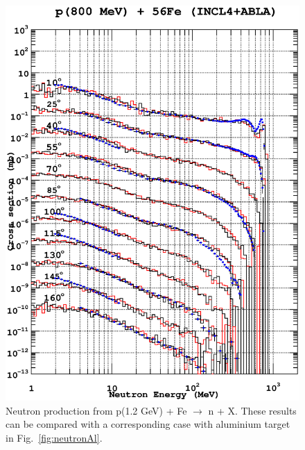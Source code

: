 \documentclass[a4paper]{jpconf}
\begin{document}
\begin{figure}
\begin{center}
\includegraphics[scale=0.70]{poster/images/iron.eps}
\caption{Neutron production from p(1.2 GeV) + Fe  $\rightarrow$ n + X. 
These results can be compared with a corresponding case with aluminium target in Fig.~\ref{fig:neutronAl}.}
\end{center}
\end{figure}



\end{document}
